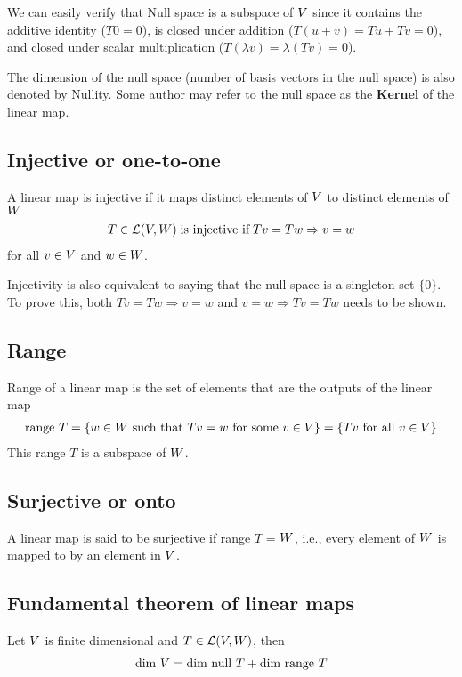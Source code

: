 \documentclass[../../linear_algebra.tex]{subfiles}
\begin{document}
We can easily verify that Null space is a subspace of $V$ since it contains the additive identity ($T0 = 0$), is closed under addition ($T(u + v) = Tu + Tv = 0$), and closed under scalar multiplication ($T(\lambda v) = \lambda(Tv) = 0$).\newline

The dimension of the null space (number of basis vectors in the null space) is also denoted by Nullity. Some author may refer to the null space as the \textbf{Kernel} of the linear map.

\subsection{Injective or one-to-one}
A linear map is injective if it maps distinct elements of $V$ to distinct elements of $W$
\begin{align*}
    T \in \mathcal{L}(V, W) \; \text{is injective if} \; Tv = Tw \Rightarrow v = w
\end{align*}
for all $v \in V$ and $w \in W$.\newline

Injectivity is also equivalent to saying that the null space is a singleton set $\{0 \}$. To prove this, both $Tv = Tw \Rightarrow v = w$ and $v = w \Rightarrow Tv = Tw$ needs to be shown.


\subsection{Range}
Range of a linear map is the set of elements that are the outputs of the linear map
\begin{align*}
    \text{range } T = \{ w \in W \text{ such that } Tv = w \text{ for some } v \in V\} = \{ Tv \text{ for all } v \in V \}
\end{align*}
This range $T$ is a subspace of $W$.


\subsection{Surjective or onto}
A linear map is said to be surjective if range $T$ = $W$, i.e., every element of $W$ is mapped to by an element in $V$.

\subsection{Fundamental theorem of linear maps}\label{fundamental_theorem_linear_maps}
Let $V$ is finite dimensional and $T \in \mathcal{L}(V, W)$, then
\begin{align*}
    \text{dim } V = \text{dim null } T + \text{dim range } T
\end{align*}
\end{document}
